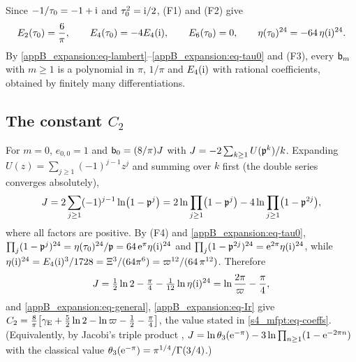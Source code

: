 Since $-1/\tau_0=-1+\mathrm{i}$ and $\tau_0^{2}=\mathrm{i}/2$, (F1) and (F2) give
\begin{equation}\label{appB_expansion:eq-tau0}
  E_2(\tau_0)=\frac6\pi,\qquad E_4(\tau_0)=-4E_4(\mathrm{i}),\qquad E_6(\tau_0)=0,\qquad \eta(\tau_0)^{24}=-64\,\eta(\mathrm{i})^{24}.
\end{equation}
By \eqref{appB_expansion:eq-lambert}--\eqref{appB_expansion:eq-tau0} and (F3), every $\mathsf{b}_m$ with $m\ge1$ is a
polynomial in $\pi$, $1/\pi$ and $E_4(\mathrm{i})$ with rational coefficients, obtained by finitely many differentiations.

\subsection{The constant \texorpdfstring{$C_{2}$}{C2}}

For $m=0$, $e_{0,0}=1$ and $\mathsf{b}_0=(8/\pi)J$ with $J=-2\sum_{k\ge1}U(\mathfrak{p}^{k})/k$. Expanding
$U(z)=\sum_{j\ge1}(-1)^{j-1}z^{j}$ and summing over $k$ first (the double series converges absolutely),
\begin{equation*}
  J=2\sum_{j\ge1}(-1)^{j-1}\ln\bigl(1-\mathfrak{p}^{j}\bigr)
   =2\ln\prod_{j\ge1}\bigl(1-\mathfrak{p}^{j}\bigr)-4\ln\prod_{j\ge1}\bigl(1-\mathfrak{p}^{2j}\bigr),
\end{equation*}
where all factors are positive. By (F4) and \eqref{appB_expansion:eq-tau0},
$\prod_{j}(1-\mathfrak{p}^{j})^{24}=\eta(\tau_0)^{24}/\mathfrak{p}=64\,\mathrm{e}^{\pi}\eta(\mathrm{i})^{24}$ and
$\prod_{j}(1-\mathfrak{p}^{2j})^{24}=\mathrm{e}^{2\pi}\eta(\mathrm{i})^{24}$, while
$\eta(\mathrm{i})^{24}=E_4(\mathrm{i})^{3}/1728=\Xi^{3}/(64\pi^{6})=\varpi^{12}/(64\,\pi^{12})$. Therefore
\begin{equation}\label{appB_expansion:eq-J}
  J=\tfrac12\ln2-\tfrac\pi4-\tfrac1{12}\ln\eta(\mathrm{i})^{24}=\ln\frac{2\pi}{\varpi}-\frac\pi4 ,
\end{equation}
and \eqref{appB_expansion:eq-general}, \eqref{appB_expansion:eq-Ir} give
$C_{2}=\frac8\pi\bigl[\gamma_{\mathrm{E}}+\tfrac52\ln2-\ln\varpi-\tfrac12-\tfrac\pi4\bigr]$, the value stated in
\eqref{s4_mfpt:eq-coeffs}. (Equivalently, by Jacobi's triple product \citep[Eq.~20.5.9]{DLMF},
$J=\ln\theta_3(\mathrm{e}^{-\pi})-3\ln\prod_{n\ge1}(1-\mathrm{e}^{-2\pi n})$ with the classical value
$\theta_3(\mathrm{e}^{-\pi})=\pi^{1/4}/\Gamma(3/4)$.)

